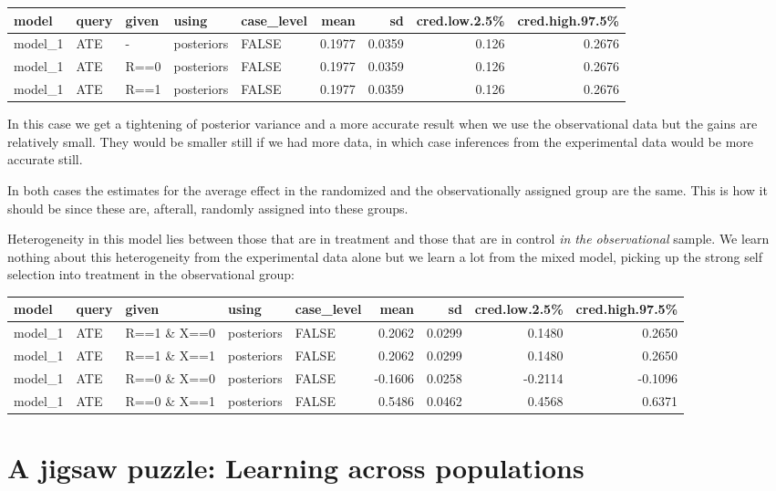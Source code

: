 \documentclass[
  12pt,
]{book}
\begin{document}
\begin{tabular}{l|l|l|l|l|r|r|r|r}
\hline
model & query & given & using & case\_level & mean & sd & cred.low.2.5\% & cred.high.97.5\%\\
\hline
model\_1 & ATE & - & posteriors & FALSE & 0.1977 & 0.0359 & 0.126 & 0.2676\\
\hline
model\_1 & ATE & R==0 & posteriors & FALSE & 0.1977 & 0.0359 & 0.126 & 0.2676\\
\hline
model\_1 & ATE & R==1 & posteriors & FALSE & 0.1977 & 0.0359 & 0.126 & 0.2676\\
\hline
\end{tabular}

In this case we get a tightening of posterior variance and a more accurate result when we use the observational data but the gains are relatively small. They would be smaller still if we had more data, in which case inferences from the experimental data would be more accurate still.

In both cases the estimates for the average effect in the randomized and the observationally assigned group are the same. This is how it should be since these are, afterall, randomly assigned into these groups.

Heterogeneity in this model lies between those that are in treatment and those that are in control \emph{in the observational} sample. We learn nothing about this heterogeneity from the experimental data alone but we learn a lot from the mixed model, picking up the strong self selection into treatment in the observational group:

\begin{tabular}{l|l|l|l|l|r|r|r|r}
\hline
model & query & given & using & case\_level & mean & sd & cred.low.2.5\% & cred.high.97.5\%\\
\hline
model\_1 & ATE & R==1 \& X==0 & posteriors & FALSE & 0.2062 & 0.0299 & 0.1480 & 0.2650\\
\hline
model\_1 & ATE & R==1 \& X==1 & posteriors & FALSE & 0.2062 & 0.0299 & 0.1480 & 0.2650\\
\hline
model\_1 & ATE & R==0 \& X==0 & posteriors & FALSE & -0.1606 & 0.0258 & -0.2114 & -0.1096\\
\hline
model\_1 & ATE & R==0 \& X==1 & posteriors & FALSE & 0.5486 & 0.0462 & 0.4568 & 0.6371\\
\hline
\end{tabular}

\hypertarget{a-jigsaw-puzzle-learning-across-populations}{%
\section{A jigsaw puzzle: Learning across populations}\label{a-jigsaw-puzzle-learning-across-populations}}
\end{document}
